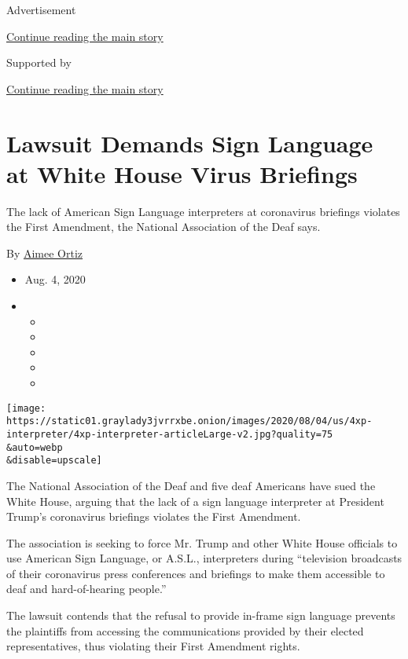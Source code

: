 Advertisement

\protect\hyperlink{after-top}{Continue reading the main story}

Supported by

\protect\hyperlink{after-sponsor}{Continue reading the main story}

\hypertarget{lawsuit-demands-sign-language-at-white-house-virus-briefings}{%
\section{Lawsuit Demands Sign Language at White House Virus
Briefings}\label{lawsuit-demands-sign-language-at-white-house-virus-briefings}}

The lack of American Sign Language interpreters at coronavirus briefings
violates the First Amendment, the National Association of the Deaf says.

By \href{https://www.nytimes3xbfgragh.onion/by/aimee-ortiz}{Aimee Ortiz}

\begin{itemize}
\item
  Aug. 4, 2020
\item
  \begin{itemize}
  \item
  \item
  \item
  \item
  \item
  \end{itemize}
\end{itemize}

\texttt{[image: https://static01.graylady3jvrrxbe.onion/images/2020/08/04/us/4xp-interpreter/4xp-interpreter-articleLarge-v2.jpg?quality=75\\\&auto=webp\\\&disable=upscale]}

The National Association of the Deaf and five deaf Americans have sued
the White House, arguing that the lack of a sign language interpreter at
President Trump's coronavirus briefings violates the First Amendment.

The association is seeking to force Mr. Trump and other White House
officials to use American Sign Language, or A.S.L., interpreters during
``television broadcasts of their coronavirus press conferences and
briefings to make them accessible to deaf and hard-of-hearing people.''

The lawsuit contends that the refusal to provide in-frame sign language
prevents the plaintiffs from accessing the communications provided by
their elected representatives, thus violating their First Amendment
rights.

